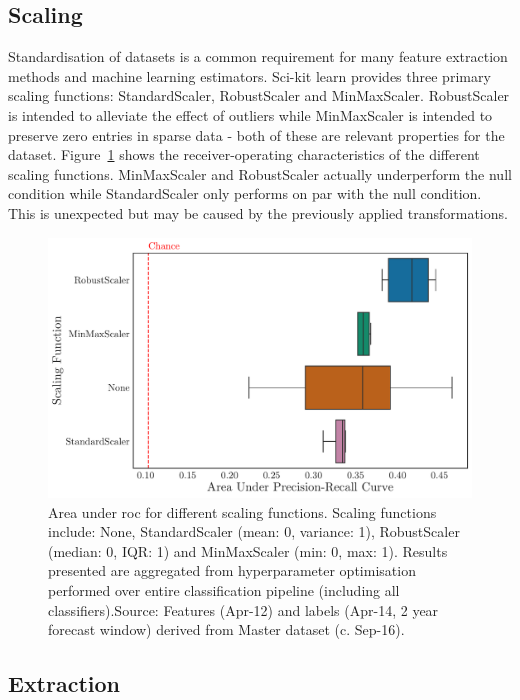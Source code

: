 \documentclass[../thesis/thesis.tex]{subfiles}
\begin{document}
\subsection{Scaling}

Standardisation of datasets is a common requirement for many feature extraction methods and machine learning estimators. Sci-kit learn provides three primary scaling functions: StandardScaler, RobustScaler and MinMaxScaler. RobustScaler is intended to alleviate the effect of outliers while MinMaxScaler is intended to preserve zero entries in sparse data - both of these are relevant properties for the dataset. Figure~\ref{fig:design:scaler} shows the receiver-operating characteristics of the different scaling functions. MinMaxScaler and RobustScaler actually underperform the null condition while StandardScaler only performs on par with the null condition. This is unexpected but may be caused by the previously applied transformations.

\begin{figure}[!htb]
    \centering
    \includegraphics[width=\textwidth]{../figures/design/scaler}
    \caption[Area under PR Curves by scaling function]{Area under \gls{roc} for different scaling functions. Scaling functions include: None, StandardScaler (mean: 0, variance: 1), RobustScaler (median: 0, IQR: 1) and MinMaxScaler (min: 0, max: 1). Results presented are aggregated from hyperparameter optimisation performed over entire classification pipeline (including all classifiers).Source: Features (Apr-12) and labels (Apr-14, 2 year forecast window) derived from Master dataset (c. Sep-16).}
    \label{fig:design:scaler}
\end{figure}

\subsection{Extraction}
\end{document}
